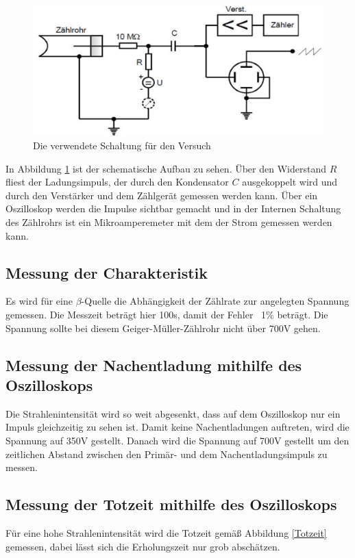 \begin{figure}[h!]
\centering
\includegraphics[scale=0.7]{Grafiken/Durchfuehrung.pdf}
\caption{Die verwendete Schaltung für den Versuch \cite{V703}}
\label{AB}
\end{figure}
In Abbildung \ref{AB} ist der schematische Aufbau zu sehen. Über den Widerstand $R$ fliest der Ladungsimpuls, der durch den Kondensator $C$ ausgekoppelt wird und durch den Verstärker und dem Zählgerät gemessen werden kann. Über ein Oszilloskop werden die Impulse sichtbar gemacht und in der Internen Schaltung des Zählrohrs ist ein Mikroamperemeter mit dem der Strom gemessen werden kann.


\subsection{Messung der Charakteristik}
Es wird für eine $\beta$-Quelle die Abhängigkeit der Zählrate zur angelegten Spannung gemessen. Die Messzeit beträgt hier 100s, damit der Fehler ~1$\%$ beträgt. Die Spannung sollte bei diesem Geiger-Müller-Zählrohr nicht über 700V gehen.


\subsection{Messung der Nachentladung mithilfe des Oszilloskops}
Die Strahlenintensität wird so weit abgesenkt, dass auf dem Oszilloskop nur ein Impuls gleichzeitig zu sehen ist. Damit keine Nachentladungen auftreten, wird die Spannung auf 350V gestellt. Danach wird die Spannung auf 700V gestellt um den zeitlichen Abstand zwischen den Primär- und dem Nachentladungsimpuls zu messen.


\subsection{Messung der Totzeit mithilfe des Oszilloskops}
Für eine hohe Strahlenintensität wird die Totzeit gemäß Abbildung \ref{Totzeit} gemessen, dabei lässt sich die Erholungszeit nur grob abschätzen.


